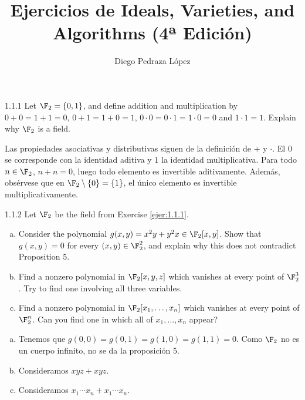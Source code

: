 \documentclass[twoside]{article}
\begin{document}
\title{Ejercicios de Ideals, Varieties, and Algorithms (4ª Edición)}
\author{Diego Pedraza López}
\maketitle

\begin{ejercicio}{1.1.1}
Let $\F_2 = \{0,1\}$, and define addition and multiplication by $0+0=1+1=0$, $0+1=1+0=1$, $0\cdot 0=0\cdot 1 = 1 \cdot 0 = 0$ and $1 \cdot 1 = 1$.
Explain why $\F_2$ is a field.
\end{ejercicio}
\begin{solucion}
Las propiedades asociativas y distributivas siguen de la definición de $+$ y $\cdot$.
El $0$ se corresponde con la identidad aditiva y $1$ la identidad multiplicativa.
Para todo $n \in \F_2$, $n+n=0$, luego todo elemento es invertible aditivamente.
Además, obsérvese que en $\F_2 \setminus \{0\} = \{1\}$, el único elemento es invertible multiplicativamente.
\end{solucion}

\begin{ejercicio}{1.1.2}
Let $\F_2$ be the field from Exercise \ref{ejer:1.1.1}.
\begin{enumerate}[a.]
\item Consider the polynomial $g(x,y)=x^2y+y^2x \in \F_2[x,y]$.
Show that $g(x,y)=0$ for every $(x,y) \in \F_2^2$, and explain why this does not contradict Proposition 5.
\item Find a nonzero polynomial in $\F_2[x,y,z]$ which vanishes at every point of $\F_2^3$.
Try to find one involving all three variables.
\item Find a nonzero polynomial in $\F_2[x_1,\dots,x_n]$ which vanishes at every point of $\F_2^n$.
Can you find one in which all of $x_1,\dots,x_n$ appear?
\end{enumerate}
\end{ejercicio}
\begin{solucion}
\begin{enumerate}[a.]
\item Tenemos que $g(0,0)=g(0,1)=g(1,0)=g(1,1)=0$.
Como $\F_2$ no es un cuerpo infinito, no se da la proposición 5.
\item Consideramos $xyz+xyz$.
\item Consideramos $x_1\cdots x_n + x_1\cdots x_n$.
\end{enumerate}
\end{solucion}
\end{document}
